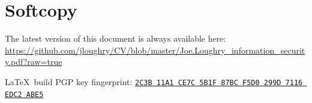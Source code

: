 \documentclass[12pt,twoside,letterpaper]{article}
\begin{document}
\vspace{-4mm}
\section*{Softcopy}
\vspace{-2mm}
The latest version of this document is always available here:
\url{https://github.com/jloughry/CV/blob/master/Joe.Loughry_information_security.pdf?raw=true}

\vfill
{\tiny \LaTeX\ build }
\hfill
PGP key fingerprint:
\href{http://call-with-current-continuation.com/Joe.Loughry.txt}%
{\texttt{2C3B 11A1 CE7C 5B1F 87BC  F5D0 299D 7116 EDC2 ABE5}}
\end{document}
